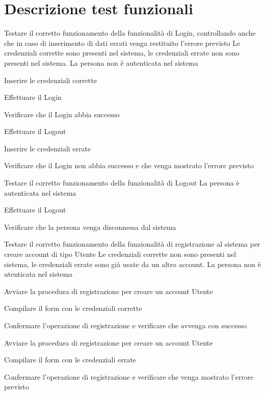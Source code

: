 \section{Descrizione test funzionali}
{Testare il corretto funzionamento della funzionalità di Login, controllando anche che in caso di inserimento di dati errati venga restituito l'errore previsto}
{Le credenziali corrette sono presenti nel sistema, le credenziali errate non sono presenti nel sistema. La persona non è autenticata nel sistema}
{\begin{enumCU}
	\item Inserire le credenziali corrette
	\item Effettuare il Login
	\item Verificare che il Login abbia successo
	\item Effettuare il Logout
	\item Inserire le credenziali errate
	\item Verificare che il Login non abbia successo e che venga mostrato l'errore previsto
\end{enumCU}
}


{Testare il corretto funzionamento della funzionalità di Logout}
{La persona è autenticata nel sistema}
{\begin{enumCU}
	\item Effettuare il Logout
	\item Verificare che la persona venga disconnessa dal sistema
\end{enumCU}
}


{Testare il corretto funzionamento della funzionalità di registrazione al sistema per creare account di tipo Utente}
{Le credenziali corrette non sono presenti nel sistema, le credenziali errate sono già usate da un altro account. La persona non è utenticata nel sistema}
{\begin{enumCU}
	\item Avviare la procedura di registrazione per creare un account Utente
	\item Compilare il form con le credenziali corrette
	\item Confermare l'operazione di registrazione e verificare che avvenga con successo
	\item Avviare la procedura di registrazione per creare un account Utente
	\item Compilare il form con le credenziali errate
	\item Confermare l'operazione di registrazione e verificare che venga mostrato l'errore previsto
\end{enumCU}}

